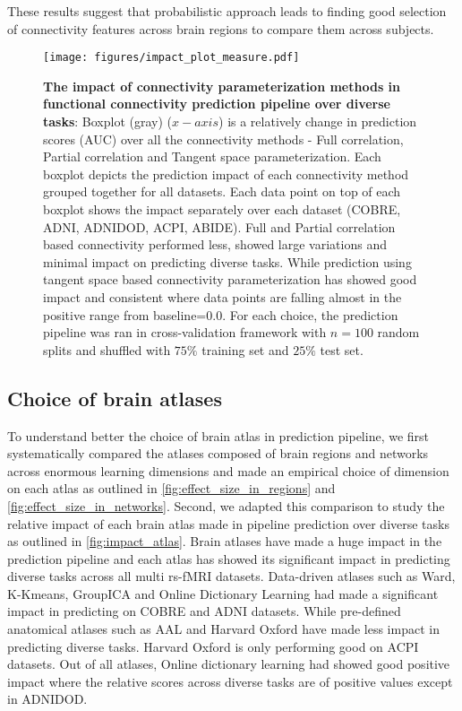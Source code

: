\documentclass[5p]{elsarticle}
\begin{document}
These results suggest that probabilistic approach leads to finding good
selection of connectivity features across brain regions to compare them across
subjects.


\begin{figure}
    \centerline{%
    \texttt{[image: figures/impact\_plot\_measure.pdf]}%
    }%
    \caption[choice of connectome]{\textbf{The impact of connectivity
            parameterization methods in functional connectivity prediction
            pipeline over diverse tasks}:
            Boxplot (gray) ($x-axis$) is a relatively change in prediction scores
            (AUC) over all the connectivity methods - Full correlation, Partial
            correlation and Tangent space parameterization. Each boxplot
            depicts the prediction impact of each connectivity method grouped
            together for all datasets. Each data
            point on top of each boxplot shows the impact separately
            over each dataset (COBRE, ADNI, ADNIDOD, ACPI, ABIDE). Full and Partial
            correlation based connectivity performed less, showed
            large variations and minimal impact on predicting diverse tasks.
            While prediction using tangent space based connectivity
            parameterization has showed good impact and consistent where
            data points are falling almost in the positive range from
            baseline=$0.0$. For each choice, the prediction pipeline
            was ran in cross-validation framework with $n=100$ random splits
            and shuffled with $75\%$ training set and $25\%$ test set.
\label{fig:impact_connectivity}}
\end{figure}

\subsection{Choice of brain atlases}
To understand better the choice of brain atlas in prediction pipeline,
we first systematically compared the atlases composed of brain regions and
networks across enormous learning dimensions and
made an empirical choice of dimension on each atlas as outlined in
\autoref{fig:effect_size_in_regions} and \autoref{fig:effect_size_in_networks}.
Second, we adapted this comparison to study the relative impact of each
brain atlas made in pipeline prediction over diverse tasks as
outlined in \autoref{fig:impact_atlas}. Brain atlases have made a huge
impact in the prediction pipeline and each atlas has showed its significant
impact in predicting diverse tasks across all multi rs-fMRI datasets.
Data-driven atlases such as Ward, K-Kmeans, GroupICA and Online Dictionary
Learning had made a significant impact in predicting on COBRE and ADNI
datasets. While pre-defined anatomical atlases such as AAL and Harvard Oxford
have made less impact in predicting diverse tasks. Harvard Oxford is only
performing good on ACPI datasets. Out of all atlases, Online dictionary
learning had showed good positive impact where the relative scores across
diverse tasks are of positive values except in ADNIDOD.
\end{document}
